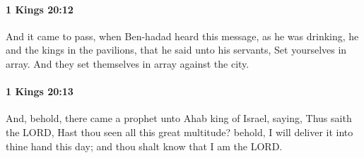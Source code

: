 		\paragraph{1 Kings 20:12} %
			\label{1KINGS-20-12}

			And it came to pass, when Ben-hadad heard this message, as he was drinking, he and the kings in the pavilions, that he said unto his servants, Set yourselves in array. And they set themselves in array against the city.


		\paragraph{1 Kings 20:13} %
			\label{1KINGS-20-13}

			And, behold, there came a prophet unto Ahab king of Israel, saying, Thus saith the LORD, Hast thou seen all this great multitude? behold, I will deliver it into thine hand this day; and thou shalt know that I am the LORD.

